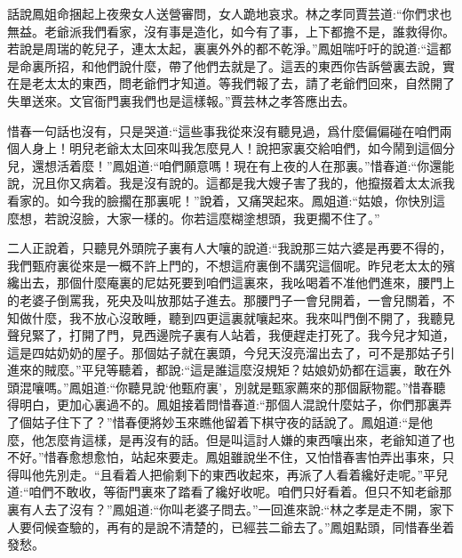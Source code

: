 


\begin{parag}
    話說鳳姐命捆起上夜衆女人送營審問，女人跪地哀求。林之孝同賈芸道:“你們求也無益。老爺派我們看家，沒有事是造化，如今有了事，上下都擔不是，誰救得你。若說是周瑞的乾兒子，連太太起，裏裏外外的都不乾淨。”鳳姐喘吁吁的說道:“這都是命裏所招，和他們說什麼，帶了他們去就是了。這丟的東西你告訴營裏去說，實在是老太太的東西，問老爺們才知道。等我們報了去，請了老爺們回來，自然開了失單送來。文官衙門裏我們也是這樣報。”賈芸林之孝答應出去。
\end{parag}


\begin{parag}
    惜春一句話也沒有，只是哭道:“這些事我從來沒有聽見過，爲什麼偏偏碰在咱們兩個人身上！明兒老爺太太回來叫我怎麼見人！說把家裏交給咱們，如今鬧到這個分兒，還想活着麼！”鳳姐道:“咱們願意嗎！現在有上夜的人在那裏。”惜春道:“你還能說，況且你又病着。我是沒有說的。這都是我大嫂子害了我的，他攛掇着太太派我看家的。如今我的臉擱在那裏呢！”說着，又痛哭起來。鳳姐道:“姑娘，你快別這麼想，若說沒臉，大家一樣的。你若這麼糊塗想頭，我更擱不住了。”
\end{parag}


\begin{parag}
    二人正說着，只聽見外頭院子裏有人大嚷的說道:“我說那三姑六婆是再要不得的，我們甄府裏從來是一概不許上門的，不想這府裏倒不講究這個呢。昨兒老太太的殯纔出去，那個什麼庵裏的尼姑死要到咱們這裏來，我吆喝着不准他們進來，腰門上的老婆子倒罵我，死央及叫放那姑子進去。那腰門子一會兒開着，一會兒關着，不知做什麼，我不放心沒敢睡，聽到四更這裏就嚷起來。我來叫門倒不開了，我聽見聲兒緊了，打開了門，見西邊院子裏有人站着，我便趕走打死了。我今兒才知道，這是四姑奶奶的屋子。那個姑子就在裏頭，今兒天沒亮溜出去了，可不是那姑子引進來的賊麼。”平兒等聽着，都說:“這是誰這麼沒規矩？姑娘奶奶都在這裏，敢在外頭混嚷嗎。”鳳姐道:“你聽見說‘他甄府裏’，別就是甄家薦來的那個厭物罷。”惜春聽得明白，更加心裏過不的。鳳姐接着問惜春道:“那個人混說什麼姑子，你們那裏弄了個姑子住下了？”惜春便將妙玉來瞧他留着下棋守夜的話說了。鳳姐道:“是他麼，他怎麼肯這樣，是再沒有的話。但是叫這討人嫌的東西嚷出來，老爺知道了也不好。”惜春愈想愈怕，站起來要走。鳳姐雖說坐不住，又怕惜春害怕弄出事來，只得叫他先別走。“且看着人把偷剩下的東西收起來，再派了人看着纔好走呢。”平兒道:“咱們不敢收，等衙門裏來了踏看了纔好收呢。咱們只好看着。但只不知老爺那裏有人去了沒有？”鳳姐道:“你叫老婆子問去。”一回進來說:“林之孝是走不開，家下人要伺候查驗的，再有的是說不清楚的，已經芸二爺去了。”鳳姐點頭，同惜春坐着發愁。
\end{parag}


